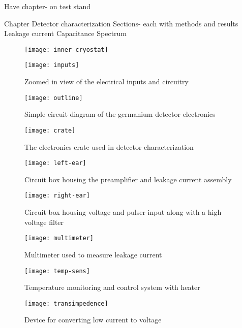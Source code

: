 Have chapter- on test stand

Chapter Detector characterization
Sections- each with methods and results
Leakage current
Capacitance
Spectrum


\begin{figure}[htpb]
\centering
\texttt{[image: inner-cryostat]}
\caption{}
\label{fig:inner-cryostat}
\end{figure}

\begin{figure}[htpb]
\centering
\texttt{[image: inputs]}
\caption{Zoomed in view of the electrical inputs and circuitry}
\label{fig:inputs}
\end{figure}

\begin{figure}[htpb]
\centering
\texttt{[image: outline]}
\caption{Simple circuit diagram of the germanium detector electronics}
\label{fig:outline}
\end{figure}

\begin{figure}[htpb]
\centering
\texttt{[image: crate]}
\caption{The electronics crate used in detector characterization}
\label{fig:crate}
\end{figure}

\begin{figure}[htpb]
\centering
\texttt{[image: left-ear]}
\caption{Circuit box housing the preamplifier and leakage current assembly}
\label{fig:left-ear}
\end{figure}

\begin{figure}[htpb]
\centering
\texttt{[image: right-ear]}
\caption{Circuit box housing voltage and pulser input along with a high voltage filter}
\label{fig:right-ear}
\end{figure}

\begin{figure}[htpb]
\centering
\texttt{[image: multimeter]}
\caption{Multimeter used to measure leakage current}
\label{fig:multimeter}
\end{figure}

\begin{figure}[htpb]
\centering
\texttt{[image: temp-sens]}
\caption{Temperature monitoring and control system with heater}
\label{fig:temp-sens}
\end{figure}

\begin{figure}[htpb]
\centering
\texttt{[image: transimpedence]}
\caption{Device for converting low current to voltage}
\label{fig:transimpedence}
\end{figure}
